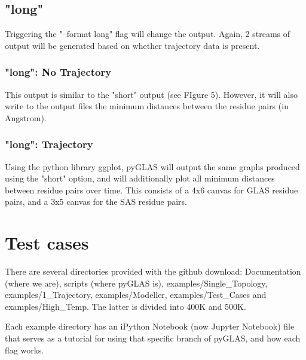 \documentclass[12pt]{article}
\begin{document}
\subsection{"long"}
Triggering the "--format long" flag will change the output. Again, 2 streams of output will be generated based on whether trajectory data is present.

\subsubsection{"long": No Trajectory}
This output is similar to the "short" output (see FIgure 5). However, it will also write to the output files the minimum distances between the residue pairs (in Angstrom).

\subsubsection{"long": Trajectory}
Using the python library ggplot, pyGLAS will output the same graphs produced using the "short" option, and will additionally plot all minimum distances between residue pairs over time. This consists of a 4x6 canvas for GLAS residue pairs, and a 3x5 canvas for the SAS residue pairs.

\section{Test cases}
There are several directories provided with the github download: Documentation (where we are), scripts (where pyGLAS is), examples/Single\_Topology, examples/1\_Trajectory, examples/Modeller, examples/Test\_Cases and examples/High\_Temp. The latter is divided into 400K and 500K.

Each example directory has an iPython Notebook (now Jupyter Notebook) file that serves as a tutorial for using that specific branch of pyGLAS, and how each flag works.

\newpage



\end{document}
